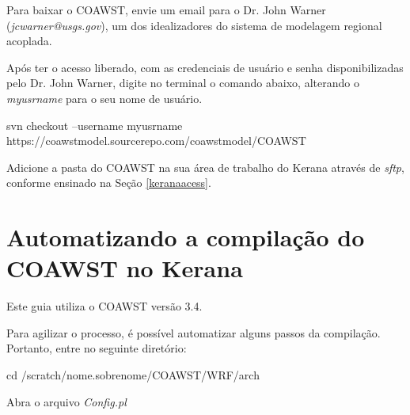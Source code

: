 \noindent Para baixar o COAWST, envie um email para o Dr. John Warner (\textcolor{bleu_cite}{\textit{jcwarner@usgs.gov}}), um dos idealizadores do sistema de modelagem regional acoplada.
\bigskip

\noindent Após ter o acesso liberado, com as credenciais de usuário e senha disponibilizadas pelo Dr. John Warner, digite no terminal o comando abaixo, alterando o \textit{myusrname} para o seu nome de usuário.
\bigskip

\begin{bashcode}[fontsize=\footnotesize]
svn checkout --username myusrname https://coawstmodel.sourcerepo.com/coawstmodel/COAWST
\end{bashcode}
\bigskip

\noindent Adicione a pasta do COAWST na sua área de trabalho do Kerana através de \textit{sftp}, conforme ensinado na Seção \textcolor{bleu_cite}{\ref{keranaacess}}.
\bigskip

\section{Automatizando a compilação do COAWST no Kerana}\label{autowrf}
\bigskip

\begin{tcolorbox}[enhanced,
  grow to left by=0cm,%
  grow to right by=0cm,%
  enlarge top by=0cm,%
  enlarge bottom by=0cm,%
  tcbox raise base,
  boxrule=1.0pt,
  left=18mm,
  colframe=red!50!black,coltext=red!25!black,colback=red!10!white,
  overlay={\begin{tcbclipinterior}\fill[red!75!blue!50!white] (frame.south west)
    rectangle node[text=white,font=\sffamily\bfseries\footnotesize,rotate=0] {ATENÇÃO} ([xshift=18mm]frame.north west);\end{tcbclipinterior}}]
Este guia utiliza o COAWST versão 3.4.
\end{tcolorbox}
\bigskip

\noindent Para agilizar o processo, é possível automatizar alguns passos da compilação. Portanto, entre no seguinte diretório:
\bigskip

\begin{bashcode}
cd /scratch/nome.sobrenome/COAWST/WRF/arch
\end{bashcode}
\bigskip

\noindent Abra o arquivo \textit{Config.pl}
\bigskip


